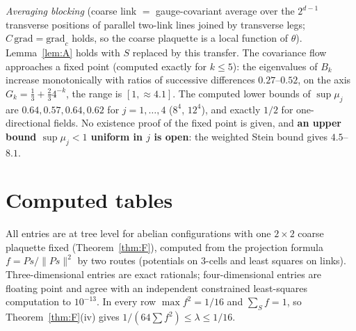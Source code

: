 \documentclass[11pt,a4paper]{article}
\theoremstyle{definition}
\theoremstyle{remark}
\begin{document}
\emph{Averaging blocking} (coarse link $=$ gauge-covariant average over the $2^{d-1}$ transverse positions of parallel two-link lines joined by transverse legs; $C\,\mathrm{grad}=\mathrm{grad}_c$ holds, so the coarse plaquette is a local function of $\theta$). Lemma~\ref{lem:A} holds with $S$ replaced by this transfer. The covariance flow approaches a fixed point (computed exactly for $k\le5$): the eigenvalues of $B_k$ increase monotonically with ratios of successive differences $0.27$--$0.52$, on the axis $G_k=\frac13+\frac23 4^{-k}$, the range is $[1,\approx4.1]$. The computed lower bounds of $\sup\mu_j$ are $0.64,0.57,0.64,0.62$ for $j=1,\dots,4$ ($8^4$, $12^4$), and exactly $1/2$ for one-directional fields. No existence proof of the fixed point is given, and \textbf{an upper bound $\sup\mu_j<1$ uniform in $j$ is open}: the weighted Stein bound gives $4.5$--$8.1$.

\section{Computed tables}\label{sec:tables}

All entries are at tree level for abelian configurations with one $2\times2$ coarse plaquette fixed (Theorem~\ref{thm:F}), computed from the projection formula $f=Ps/\|Ps\|^2$ by two routes (potentials on $3$-cells and least squares on links). Three-dimensional entries are exact rationals; four-dimensional entries are floating point and agree with an independent constrained least-squares computation to $10^{-13}$. In every row $\max f^2=1/16$ and $\sum_Sf=1$, so Theorem~\ref{thm:F}(iv) gives $1/(64\sum f^2)\le\lambda\le1/16$.
\end{document}
